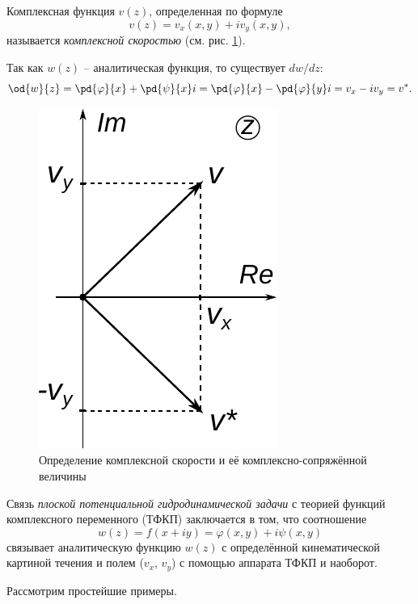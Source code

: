 \documentclass[a4paper, 14pt]{extarticle}
\begin{document}
		
\begin{dfn}
	Комплексная функция $v(z)$, определенная по формуле
	\[
	v(z) = v_x(x,y) + i v_y(x,y),
	\] 
	называется  \textit{комплексной скоростью} (см. рис. \ref{fig:v_complex_dfn}).
\end{dfn}

Так как $w(z)$ -- аналитическая функция, то существует $dw/dz$:
\[
\od{w}{z} = \pd{\varphi}{x}+\pd{\psi}{x} i = 
\pd{\varphi}{x}-\pd{\varphi}{y} i = v_x-i v_y = v^*. 
\]

\begin{figure}
	\centering
	\includegraphics[width=0.3\linewidth]{../img/v_star.pdf}
	\caption{Определение комплексной скорости и её комплексно-сопряжённой величины}
	\label{fig:v_complex_dfn}
\end{figure}
					
Связь \textit{плоской потенциальной гидродинамической задачи} с теорией функций комплексного переменного (ТФКП) заключается в том, что соотношение
\[
w(z) = f(x+iy) = \varphi(x,y) + i  \psi(x,y)
\]
связывает аналитическую функцию $w(z)$ с определённой кинематической картиной течения и полем ($v_x$, $v_y$) с помощью аппарата ТФКП и наоборот.

\bigskip
Рассмотрим простейшие примеры.
\end{document}
